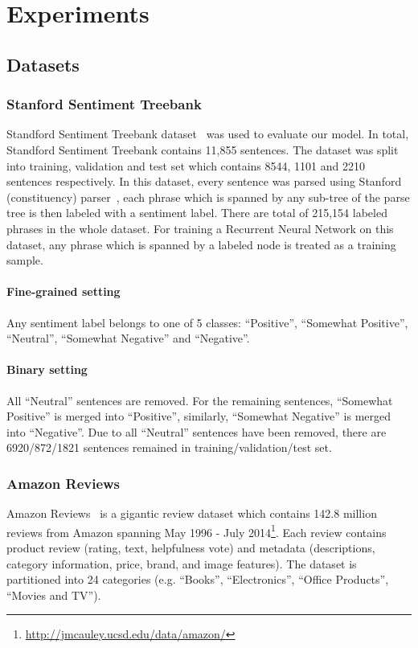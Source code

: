 \section{Experiments}
\subsection{Datasets}
\subsubsection{Stanford Sentiment Treebank} \label{sec:sst}
Standford Sentiment Treebank dataset~\cite{socher2013recursive} was used to evaluate our model.
In total, Standford Sentiment Treebank contains 11,855 sentences.
The dataset was split into training, validation and test set which contains 8544, 1101 and 2210 sentences respectively.
In this dataset, every sentence was parsed using Stanford (constituency) parser~\cite{socher2013recursive}, each phrase which is spanned by any sub-tree of the parse tree is then labeled with  a sentiment label.
There are total of 215,154 labeled phrases in the whole dataset.
For training a Recurrent Neural Network on this dataset, any phrase which is spanned by a labeled node is treated as a training sample. 
\paragraph{Fine-grained setting} Any sentiment label belongs to one of 5 classes: ``Positive'', ``Somewhat Positive'', ``Neutral'', ``Somewhat Negative'' and ``Negative''.
\paragraph{Binary setting} All ``Neutral'' sentences are removed.
For the remaining sentences, ``Somewhat Positive'' is merged into ``Positive'', similarly, ``Somewhat Negative'' is merged into ``Negative''.
Due to all ``Neutral'' sentences have been removed, there are 6920/872/1821 sentences remained in training/validation/test set.
\subsubsection{Amazon Reviews}\label{sec:amazon}
Amazon Reviews~\cite{amazon-reviews} is a gigantic review dataset
which contains 142.8 million reviews from Amazon spanning May 1996 - July 2014\footnote{\url{http://jmcauley.ucsd.edu/data/amazon/}}.
Each review contains product review (rating, text, helpfulness vote) and metadata (descriptions, category information, price, brand, and image features).
The dataset is partitioned into 24 categories (e.g. ``Books'', ``Electronics'', ``Office Products'', ``Movies and TV'').
